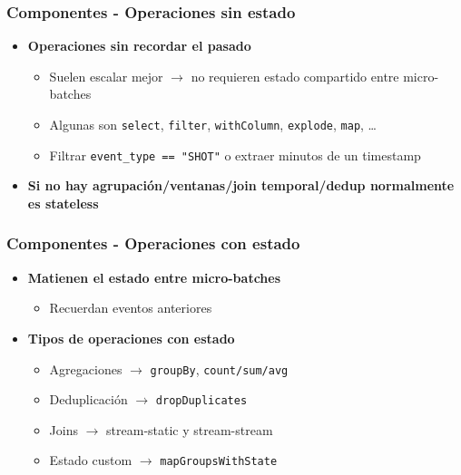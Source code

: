 \documentclass[aspectratio=169]{beamer}
\begin{document}
\begin{frame}\frametitle{Componentes - Operaciones sin estado}
	\begin{itemize}
		\item \textbf{Operaciones sin recordar el pasado}
		\begin{itemize}
			\item Suelen escalar mejor $\rightarrow$ no requieren estado compartido entre micro-batches
			\item Algunas son \texttt{select}, \texttt{filter}, \texttt{withColumn}, \texttt{explode}, \texttt{map}, \dots
			\item Filtrar \texttt{event\_type == "SHOT"} o extraer minutos de un timestamp
		\end{itemize}
		\vspace{1em}
		\item \textbf{Si no hay agrupación/ventanas/join temporal/dedup normalmente es stateless}
	\end{itemize}
\end{frame}

\begin{frame}\frametitle{Componentes - Operaciones con estado}
	\begin{itemize}
		\item \textbf{Matienen el estado entre micro-batches}
		\begin{itemize}
			\item Recuerdan eventos anteriores
		\end{itemize}
		
		\vspace{1em}
	
		\item \textbf{Tipos de operaciones con estado}
		\begin{itemize}
			\item Agregaciones $\rightarrow$ \texttt{groupBy}, \texttt{count/sum/avg}
			\item Deduplicación  $\rightarrow$ \texttt{dropDuplicates}
			\item Joins  $\rightarrow$ stream-static y stream-stream
			\item Estado custom  $\rightarrow$ \texttt{mapGroupsWithState}
		\end{itemize}	
	\end{itemize}
\end{frame}
\end{document}
